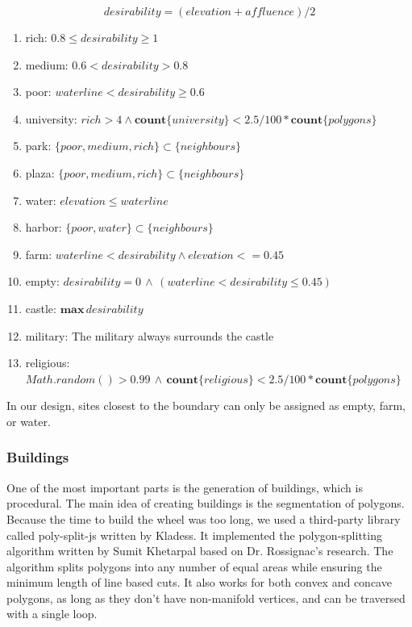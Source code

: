\[ desirability = (elevation + affluence) / 2 \]

\begin{enumerate}
  \item rich: $0.8 \leq desirability \geq 1$
  \item medium: $0.6 < desirability > 0.8$
  \item poor: $waterline < desirability \geq 0.6$
  \item university: $rich > 4 \wedge \mathbf{count} \{university\} < 2.5 / 100 * \mathbf{count} \{polygons\}$
  \item park: $\{poor, medium, rich\} \subset \{neighbours\}$
  \item plaza: $\{poor, medium, rich\} \subset \{neighbours\}$
  \item water: $elevation \leq waterline$
  \item harbor: $\{poor, water\} \subset \{neighbours\}$
  \item farm: $waterline < desirability \wedge elevation <= 0.45$
  \item empty: $desirability = 0 \, \wedge \, (waterline < desirability \leq 0.45)$
  \item castle: $\mathbf{max}\,desirability$
  \item military: The military always surrounds the castle
  \item religious: $Math.random() > 0.99 \, \wedge \, \mathbf{count} \{religious\} < 2.5 / 100 * \mathbf{count} \{polygons\}$
\end{enumerate}

In our design, sites closest to the boundary can only be assigned as empty, farm, or water.

\subsubsection{Buildings}
One of the most important parts is the generation of buildings, which is procedural.
The main idea of creating buildings is the segmentation of polygons. Because the time to build the wheel was too long, we used a third-party library called poly-split-js written by Kladess. It implemented the polygon-splitting algorithm written by Sumit Khetarpal based on Dr. Rossignac's research. The algorithm splits polygons into any number of equal areas while ensuring the minimum length of line based cuts. It also works for both convex and concave polygons, as long as they don't have non-manifold vertices, and can be traversed with a single loop.

